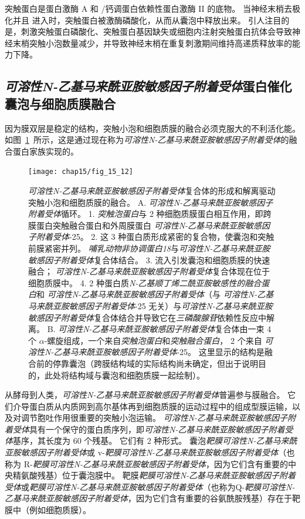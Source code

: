 突触蛋白是蛋白激酶 A 和 /钙调蛋白依赖性蛋白激酶 II 的底物。
当神经末梢去极化并且  进入时，突触蛋白被激酶磷酸化，从而从囊泡中释放出来。
引人注目的是，刺激突触蛋白磷酸化、突触蛋白基因缺失或细胞内注射突触蛋白抗体会导致神经末梢突触小泡数量减少，并导致神经末梢在重复刺激期间维持高递质释放率的能力下降。



\subsection{\textit{可溶性N-乙基马来酰亚胺敏感因子附着受体}蛋白催化囊泡与细胞质膜融合}

因为膜双层是稳定的结构，突触小泡和细胞质膜的融合必须克服大的不利活化能。
如图~\ref{fig:15_12}~所示，这是通过现在称为\textit{可溶性N-乙基马来酰亚胺敏感因子附着受体}的融合蛋白家族实现的。


\begin{figure}[htbp]
	\centering
	\texttt{[image: chap15/fig\_15\_12]}
	\caption{\textit{可溶性N-乙基马来酰亚胺敏感因子附着受体}复合体的形成和解离驱动突触小泡和细胞质膜的融合\cite{rizo2002snares}。
		 A. \textit{可溶性N-乙基马来酰亚胺敏感因子附着受体}循环。
		 1. \textit{突触泡蛋白}与 2 种细胞质膜蛋白相互作用，即跨膜蛋白突触融合蛋白和外周膜蛋白 \textit{可溶性N-乙基马来酰亚胺敏感因子附着受体}-25。
		 2. 这 3 种蛋白质形成紧密的复合物，使囊泡和突触前膜紧密并列。
		 \textit{哺乳动物非协调蛋白18}与\textit{可溶性N-乙基马来酰亚胺敏感因子附着受体}复合体结合。
		 3. 流入引发囊泡和细胞质膜的快速融合；
		 \textit{可溶性N-乙基马来酰亚胺敏感因子附着受体}复合体现在位于细胞质膜中。
		 4. 2 种蛋白质\textit{N-乙基顺丁烯二酰亚胺敏感性的融合蛋白}和 \textit{可溶性N-乙基马来酰亚胺敏感因子附着受体}（与 \textit{可溶性N-乙基马来酰亚胺敏感因子附着受体}-25 无关）与\textit{可溶性N-乙基马来酰亚胺敏感因子附着受体}复合体结合并导致它在\textit{三磷酸腺苷}依赖性反应中解离。
		 B. \textit{可溶性N-乙基马来酰亚胺敏感因子附着受体}复合体由一束 4 个 $\alpha$-螺旋组成，一个来自\textit{突触泡蛋白}和\textit{突触融合蛋白}， 2 个来自 \textit{可溶性N-乙基马来酰亚胺敏感因子附着受体}-25。
		 这里显示的结构是融合前的停靠囊泡（跨膜结构域的实际结构尚未确定，但出于说明目的，此处将结构域与囊泡和细胞质膜一起绘制）。}
	\label{fig:15_12}
\end{figure}


从酵母到人类，\textit{可溶性N-乙基马来酰亚胺敏感因子附着受体}普遍参与膜融合。
它们介导蛋白质从内质网到高尔基体再到细胞质膜的运动过程中的组成型膜运输，以及对调节胞吐作用很重要的突触小泡运输。
\textit{可溶性N-乙基马来酰亚胺敏感因子附着受体}具有一个保守的蛋白质序列，即\textit{可溶性N-乙基马来酰亚胺敏感因子附着受体}基序，其长度为 60 个残基。
它们有 2 种形式。
囊泡\textit{靶膜可溶性N-乙基马来酰亚胺敏感因子附着受体}或 v-\textit{靶膜可溶性N-乙基马来酰亚胺敏感因子附着受体}（也称为 R-\textit{靶膜可溶性N-乙基马来酰亚胺敏感因子附着受体}，因为它们含有重要的中央精氨酸残基）位于囊泡膜中。
靶膜\textit{靶膜可溶性N-乙基马来酰亚胺敏感因子附着受体}或\textit{靶膜可溶性N-乙基马来酰亚胺敏感因子附着受体}（也称为Q-\textit{靶膜可溶性N-乙基马来酰亚胺敏感因子附着受体}，因为它们含有重要的谷氨酰胺残基）存在于靶膜中（例如细胞质膜）。


